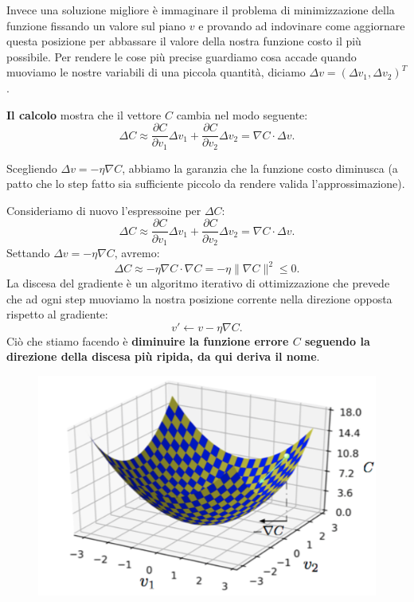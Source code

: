 Invece una soluzione migliore è immaginare il problema di minimizzazione della funzione fissando un valore sul piano $v$ e provando ad indovinare come aggiornare questa posizione per abbassare il valore della nostra funzione costo il più possibile.
\newline
\newline
Per rendere le cose più precise guardiamo cosa accade quando muoviamo le nostre variabili di una piccola quantità, diciamo  $\Delta v=(\Delta v_1,\Delta v_2)^T$.


\textbf{Il calcolo} mostra che il vettore $C$ cambia nel modo seguente:
\begin{equation}
    \Delta C\approx \frac{\partial C}{\partial v_1}\Delta v_1 + \frac{\partial C}{\partial v_2}\Delta v_2 = \nabla C \cdot \Delta v.
\end{equation}

Scegliendo $\Delta v=-\eta\nabla C$, abbiamo la garanzia che la funzione costo diminusca (a patto che lo step fatto sia sufficiente piccolo da rendere valida l’approssimazione).


Consideriamo di nuovo l'espressoine per $\Delta C$:
\begin{equation}
    \Delta C\approx \frac{\partial C}{\partial v_1}\Delta v_1 + \frac{\partial C}{\partial v_2}\Delta v_2 = \nabla C \cdot \Delta v.
\end{equation}
Settando $\Delta v=-\eta\nabla C$, avremo:
\begin{equation}
    \Delta C \approx -\eta\nabla C\cdot \nabla C = -\eta \| \nabla C \|^2 \leq 0.
\end{equation}
\newpage
La discesa del gradiente è un algoritmo  iterativo di ottimizzazione che prevede che ad ogni step muoviamo la nostra posizione corrente nella direzione opposta rispetto al gradiente:
\begin{equation}
    v'\leftarrow v-\eta\nabla C.
\end{equation}
Ciò che stiamo facendo è \textbf{diminuire la funzione errore $C$ seguendo la direzione della discesa più ripida, da qui deriva il nome}.
\begin{figure}[!h]
    \includegraphics[scale=.5]{images/gradient_descent/grad_desc.png}
    \centering
\end{figure}


